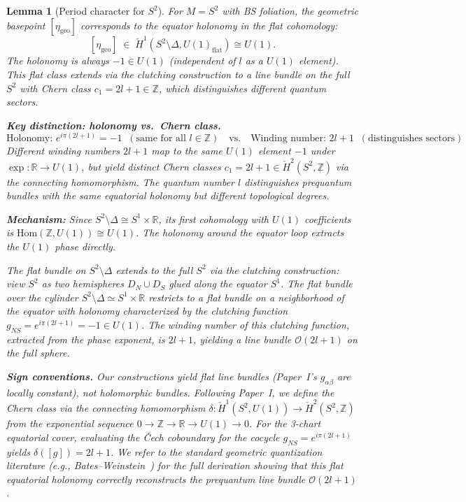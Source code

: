 \documentclass[11pt]{article}
\newtheorem{lemma}[theorem]{Lemma}
\begin{document}
\begin{lemma}[Period character for $S^2$]
\label{lem:identification-S2}
For $M = S^2$ with BS foliation, the geometric basepoint $[\eta_{\mathrm{geo}}]$ corresponds to the equator holonomy in the flat cohomology:
\[
  [\eta_{\mathrm{geo}}] \;\in\; \check{H}^1(S^2 \setminus \Delta, U(1)_{\mathrm{flat}}) \cong U(1).
\]
The holonomy is always $-1 \in U(1)$ (independent of $l$ as a $U(1)$ element). This flat class extends via the clutching construction to a line bundle on the full $S^2$ with Chern class $c_1 = 2l+1 \in \mathbb{Z}$, which distinguishes different quantum sectors.

\textbf{Key distinction: holonomy vs.~Chern class.}
\begin{equation}
\text{Holonomy: } e^{i\pi(2l+1)} = -1 \;\;(\text{same for all } l \in \mathbb{Z})
\quad\text{vs.}\quad
\text{Winding number: } 2l+1 \;\;(\text{distinguishes sectors})
\end{equation}
Different winding numbers $2l+1$ map to the same $U(1)$ element $-1$ under $\exp: \mathbb{R} \to U(1)$, but yield distinct Chern classes $c_1 = 2l+1 \in \check{H}^2(S^2, \mathbb{Z})$ via the connecting homomorphism. The quantum number $l$ distinguishes prequantum bundles with the same equatorial holonomy but different topological degrees.

\textbf{Mechanism:} Since $S^2 \setminus \Delta \cong S^1 \times \mathbb{R}$, its first cohomology with $U(1)$ coefficients is $\mathrm{Hom}(\mathbb{Z}, U(1)) \cong U(1)$. The holonomy around the equator loop extracts the $U(1)$ phase directly.

The flat bundle on $S^2 \setminus \Delta$ extends to the full $S^2$ via the \emph{clutching construction}: view $S^2$ as two hemispheres $D_N \cup D_S$ glued along the equator $S^1$. The flat bundle over the cylinder $S^2 \setminus \Delta \simeq S^1 \times \mathbb{R}$ restricts to a flat bundle on a neighborhood of the equator with holonomy characterized by the clutching function $g_{NS} = e^{i\pi(2l+1)} = -1 \in U(1)$. The winding number of this clutching function, extracted from the phase exponent, is $2l+1$, yielding a line bundle $\mathcal{O}(2l+1)$ on the full sphere.

\textbf{Sign conventions.} Our constructions yield \emph{flat} line bundles (Paper~I's $g_{\alpha\beta}$ are locally constant), not holomorphic bundles. Following Paper~I, we define the Chern class via the connecting homomorphism $\delta: \check{H}^1(S^2, U(1)) \to \check{H}^2(S^2, \mathbb{Z})$ from the exponential sequence $0 \to \mathbb{Z} \to \mathbb{R} \to U(1) \to 0$. For the 3-chart equatorial cover, evaluating the \v{C}ech coboundary for the cocycle $g_{NS} = e^{i\pi(2l+1)}$ yields $\delta([g]) = 2l+1$. We refer to the standard geometric quantization literature (e.g., Bates--Weinstein~\cite[\S 7.4]{BW97}) for the full derivation showing that this flat equatorial holonomy correctly reconstructs the prequantum line bundle $\mathcal{O}(2l+1)$.


\end{lemma}
\end{document}
